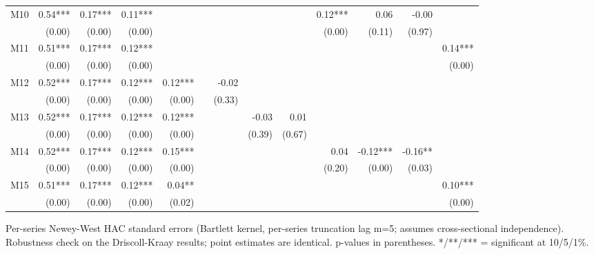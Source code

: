\begin{table}[htbp]
{\begin{tabular}{lrrrrrrrrrrrr}
M10 & 0.54*** & 0.17*** & 0.11*** &  &  &  &  &  & 0.12*** & 0.06 & -0.00 &  \\
 & (0.00) & (0.00) & (0.00) &  &  &  &  &  & (0.00) & (0.11) & (0.97) &  \\
M11 & 0.51*** & 0.17*** & 0.12*** &  &  &  &  &  &  &  &  & 0.14*** \\
 & (0.00) & (0.00) & (0.00) &  &  &  &  &  &  &  &  & (0.00) \\
M12 & 0.52*** & 0.17*** & 0.12*** & 0.12*** &  & -0.02 &  &  &  &  &  &  \\
 & (0.00) & (0.00) & (0.00) & (0.00) &  & (0.33) &  &  &  &  &  &  \\
M13 & 0.52*** & 0.17*** & 0.12*** & 0.12*** &  &  & -0.03 & 0.01 &  &  &  &  \\
 & (0.00) & (0.00) & (0.00) & (0.00) &  &  & (0.39) & (0.67) &  &  &  &  \\
M14 & 0.52*** & 0.17*** & 0.12*** & 0.15*** &  &  &  &  & 0.04 & -0.12*** & -0.16** &  \\
 & (0.00) & (0.00) & (0.00) & (0.00) &  &  &  &  & (0.20) & (0.00) & (0.03) &  \\
M15 & 0.51*** & 0.17*** & 0.12*** & 0.04** &  &  &  &  &  &  &  & 0.10*** \\
 & (0.00) & (0.00) & (0.00) & (0.02) &  &  &  &  &  &  &  & (0.00) \\
\bottomrule
\end{tabular}%
}
\smallskip
\small
\noindent Per-series Newey-West HAC standard errors (Bartlett kernel, per-series truncation lag m=5; assumes cross-sectional independence). Robustness check on the Driscoll-Kraay results; point estimates are identical. p-values in parentheses. */**/*** = significant at 10/5/1\%.
\end{table}